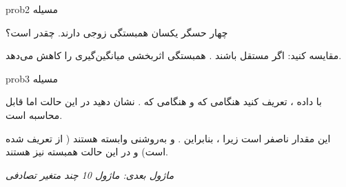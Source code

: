 \begin{PSbox}[unbreakable]{prob}{مسیله 2}

چهار حسگر یکسان  همبستگی زوجی  دارند.  چقدر است؟

\PSsolution{} 

مقایسه کنید: اگر مستقل باشند . همبستگی اثربخشی میانگین‌گیری را کاهش می‌دهد.

\end{PSbox}

\begin{PSbox}[unbreakable]{prob}{مسیله 3}

با داده ، تعریف کنید  هنگامی که  و  هنگامی که . نشان دهید در این حالت  اما  قابل محاسبه است.

\PSsolution{} \PSbr{}\PSbr{}این مقدار ناصفر است زیرا ، بنابراین .\PSbr{} و  به‌روشنی وابسته هستند ( از  تعریف شده است) و در این حالت همبسته نیز هستند.

\emph{ماژول بعدی: {ماژول 10  چند متغیر تصادفی}}

\end{PSbox}
